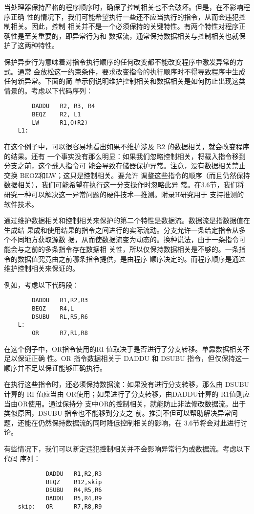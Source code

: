 当处理器保持严格的程序顺序时，确保了控制相关也不会破坏。但是，在不影响程序正确
性的情况下，我们可能希望执行一些还不应当执行的指令，从而会违犯控制相关。因此，控制
相关并不是一个必须保持的关键特性。有两个特性对程序正确性是至关重要的，即异常行为和
数据流，通常保持数据相关与控制相关也就保护了这两种特性。

保护异步行为意味着对指令执行顺序的任何改变都不能改变程序中激发异常的方式。通常
会放松这一约束条件，要求改变指令的执行顺序时不得导致程序中生成任何新异常。下面的简
单示例说明维护控制相关和数据相关是如何防止出现这类情景的。考虑以下代码序列：
\begin{verbatim}
        DADDU   R2, R3, R4
        BEQZ    R2, L1
        LW      R1,O(R2)
    L1:
\end{verbatim}
在这个例子中，可以很容易地看出如果不维护涉及 R2 的数据相关，就会改变程序的结果。还有
一个事实没有那么明显：如果我们忽略控制相关，将载入指令移到分支之前，这个载人指令可
能会导致存储器保护异常。注意，没有数据相关禁止交换 BEOZ和LW；这只是控制相关。要允许
调整这些指令的顺序（而且仍然保持数据相关），我们可能希望在执行这一分支操作时忽略此异
常。在3.6节，我们将研究一种可以解决这一异常问题的硬件技术—推测。附录H研究用于
支持推测的软件技术。

通过维护数据相关和控制相关来保护的第二个特性是数据流。数据流是指数据值在生成结
果成和使用结果的指令之间进行的实际流动。分支允许一条给定指令从多个不同地方获取源数
据，从而使数据流变为动态的。换种说法，由于一条指令可能会与之前的多条指令存在数据相
关性，所以仅保持数据相关是不够的。一条指令的数据值究竟由之前哪条指令提供，是由程序
顺序决定的。而程序顺序是通过维护控制相关来保证的。

例如，考虑以下代码段：
\begin{verbatim}
        DADDU   R1,R2,R3
        BEQZ    R4,L
        DSUBU   RL,R5,R6
    L:
        OR      R7,R1,R8
\end{verbatim}

在这个例子中，OR指令使用的RI 值取决于是否进行了分支转移。单靠数据相关不足以保证正确
性。OR 指令数据相关于 DADDU 和 DSUBU 指令，但仅保持这一顺序并不足以保证能够正确执行。

在执行这些指令时，还必须保持数据流：如果没有进行分支转移，那么由 DSUBU 计算的 RI
值应当由 OR使用；如果进行了分支转移，由DADDU计算的 R1值则应当由OR使用。通过保持分
支中OR的控制相关，就能防止非法修改数据流。出于类似原因，DSUBU 指令也不能移到分支之
前。推测不但可以帮助解决异常问题，还能在仍然保持数据流的同时降低控制相关的影响，在
3.6节将会对此进行讨论。

有些情况下，我们可以断定违犯控制相关并不会影响异常行为或数据流。考虑以下代码
序列：
\begin{verbatim}
            DADDU   R1,R2,R3
            BEQZ    R12,skip
            DSUBU   R4,R5,R6
            DADDU   R5,R4,R9
    skip:   OR      R7,R8,R9
\end{verbatim}

